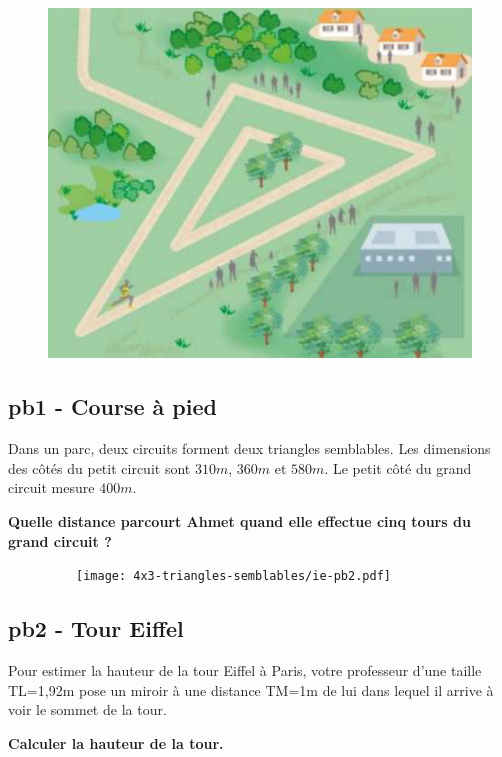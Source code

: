 \begin{minipage}[t]{0.3\textwidth}
  \begin{figure}[H]
        \includegraphics[width=0.7\linewidth]{4x3-triangles-semblables/ie-pb1.png}
  \end{figure}
\end{minipage}
\begin{minipage}[t]{0.65\textwidth}
  \subsection*{pb1 - Course à pied}

  Dans un parc, deux circuits forment deux triangles semblables. Les dimensions des côtés du petit circuit sont $310m$, $360m$ et $580m$. Le petit côté du grand circuit mesure $400 m$.

  \textbf{Quelle distance parcourt Ahmet quand elle effectue cinq tours du grand circuit ?}
\end{minipage}

\horrule{1px}

\begin{minipage}[t]{0.5\textwidth}
  \begin{figure}[H]
          \texttt{[image: 4x3-triangles-semblables/ie-pb2.pdf]}
  \end{figure}
\end{minipage}
\begin{minipage}[t]{0.45\textwidth}
  \subsection*{pb2 - Tour Eiffel}

  Pour estimer la hauteur de la tour Eiffel à Paris, votre professeur d'une taille TL=1,92m pose un miroir à une distance TM=1m de lui dans lequel il arrive à voir le sommet de la tour. 

\textbf{Calculer la hauteur de la tour.}
\end{minipage}

